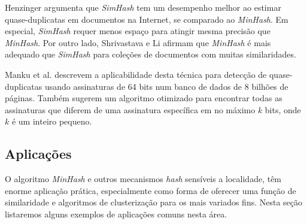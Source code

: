 Henzinger \cite{henzinger2006finding} argumenta que \emph{SimHash} tem um desempenho melhor ao estimar quase-duplicatas em documentos na Internet, se comparado ao \emph{MinHash}. Em especial, \emph{SimHash} requer menos espaço para atingir mesma precisão que \emph{MinHash}. Por outro lado, Shrivastava e Li \cite{shrivastava2014defense} afirmam que \emph{MinHash} é mais adequado que \emph{SimHash} para coleções de documentos com muitas similaridades.

Manku et al. \cite{manku2007detecting} descrevem a aplicabilidade desta técnica para detecção de quase-duplicatas usando assinaturas de 64 bits num banco de dados de 8 bilhões de páginas. Também sugerem um algoritmo otimizado para encontrar todas as assinaturas que diferem de uma assinatura específica em no máximo $k$ bits, onde $k$ é um inteiro pequeno.

\subsection{Aplicações}

O algoritmo \emph{MinHash} e outros mecanismos \emph{hash} sensíveis a localidade, têm enorme aplicação prática, especialmente como forma de oferecer uma função de similaridade e algoritmos de clusterização para os mais variados fins. Nesta seção listaremos alguns exemplos de aplicações comuns nesta área.

